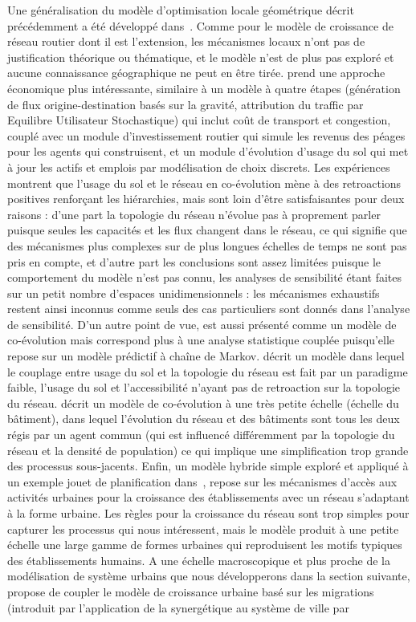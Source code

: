 {Une généralisation du modèle d'optimisation locale géométrique décrit précédemment a été développé dans~\cite{barthelemy2009co}. Comme pour le modèle de croissance de réseau routier dont il est l'extension, les mécanismes locaux n'ont pas de justification théorique ou thématique, et le modèle n'est de plus pas exploré et aucune connaissance géographique ne peut en être tirée. \cite{levinson2007co} prend une approche économique plus intéressante, 
similaire à un modèle à quatre étapes (génération de flux origine-destination basés sur la gravité, attribution du traffic par Equilibre Utilisateur Stochastique) qui inclut coût de transport et congestion, couplé avec un module d'investissement routier qui simule les revenus des péages pour les agents qui construisent, et un module d'évolution d'usage du sol qui met à jour les actifs et emplois par modélisation de choix discrets. Les expériences montrent que l'usage du sol et le réseau en co-évolution mène à des retroactions positives renforçant les hiérarchies, mais sont loin d'être satisfaisantes pour deux raisons : d'une part la topologie du réseau n'évolue pas à proprement parler puisque seules les capacités et les flux changent dans le réseau, ce qui signifie que des mécanismes plus complexes sur de plus longues échelles de temps ne sont pas pris en compte, et d'autre part les conclusions sont assez limitées puisque le comportement du modèle n'est pas connu, les analyses de sensibilité étant faites sur un petit nombre d'espaces unidimensionnels : les mécanismes exhaustifs restent ainsi inconnus comme seuls des cas particuliers sont donnés dans l'analyse de sensibilité. D'un autre point de vue, \cite{levinson2005paving} est aussi présenté comme un modèle de co-évolution mais correspond plus à une analyse statistique couplée puisqu'elle repose sur un modèle prédictif à chaîne de Markov. \cite{rui2011urban} décrit un modèle dans lequel le couplage entre usage du sol et la topologie du réseau est fait par un paradigme faible, l'usage du sol et l'accessibilité n'ayant pas de retroaction sur la topologie du réseau. \cite{achibet2014model} décrit un modèle de co-évolution à une très petite échelle (échelle du bâtiment), dans lequel l'évolution du réseau et des bâtiments sont tous les deux régis par un agent commun (qui est influencé différemment par la topologie du réseau et la densité de population) ce qui implique une simplification trop grande des processus sous-jacents. Enfin, un modèle hybride simple exploré et appliqué à un exemple jouet de planification dans~\cite{raimbault2014hybrid}, repose sur les mécanismes d'accès aux activités urbaines pour la croissance des établissements avec un réseau s'adaptant à la forme urbaine. Les règles pour la croissance du réseau sont trop simples pour capturer les processus qui nous intéressent, mais le modèle produit à une petite échelle une large gamme de formes urbaines qui reproduisent les motifs typiques des établissements humains. A une échelle macroscopique et plus proche de la modélisation de système urbains que nous développerons dans la section suivante, \cite{baptiste1999interactions} propose de coupler le modèle de croissance urbaine basé sur les migrations (introduit par l'application de la synergétique au système de ville par }
